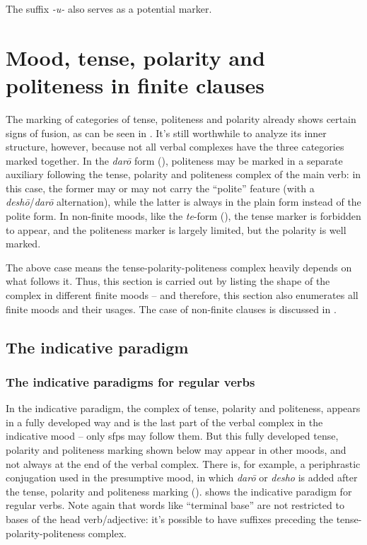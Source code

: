 \documentclass[UTF8, a4paper, oneside, scheme=plain]{ctexrep}
\newcommand{\corpus}[1]{\emph{#1}}
\begin{document}
The suffix \corpus{-u-} also serves as a potential marker.

\section{Mood, tense, polarity and politeness in finite clauses}\label{sec:tense-polarity-polite}

The marking of categories of tense, politeness and polarity 
already shows certain signs of fusion,
as can be seen in .
It's still worthwhile to analyze its inner structure, however,
because not all verbal complexes have the three categories marked together.
In the \corpus{dar\={o}} form (),
politeness may be marked in a separate auxiliary following 
the tense, polarity and politeness complex of the main verb:
in this case, the former may or may not carry the ``polite'' feature
(with a \corpus{desh\={o}}/\corpus{dar\={o}} alternation),
while the latter is always in the plain form instead of the polite form.
In non-finite moods, like the \corpus{te}-form (), 
the tense marker is forbidden to appear,
and the politeness marker is largely limited,
but the polarity is well marked.

The above case means the tense-polarity-politeness complex heavily depends on what follows it.
Thus, this section is carried out by listing the shape of the complex in different finite moods
-- and therefore, this section also enumerates all finite moods and their usages.
The case of non-finite clauses is discussed in .

\subsection{The indicative paradigm}\label{sec:indicative-paradigm}

\subsubsection{The indicative paradigms for regular verbs}

In the indicative paradigm, the complex of tense, polarity and politeness,
appears in a fully developed way
and is the last part of the verbal complex in the indicative mood
-- only \ac{sfp}s may follow them.
But this fully developed tense, polarity and politeness marking shown below
may appear in other moods, and not always at the end of the verbal complex.
There is, for example, a periphrastic conjugation used in the presumptive mood, 
in which \corpus{dar\={o}} or \corpus{desho} is added after the tense, polarity and politeness marking
().
 shows the indicative paradigm for regular verbs. 
Note again that words like ``terminal base'' are not restricted to bases of the head verb/adjective:
it's possible to have suffixes preceding the tense-polarity-politeness complex.
\end{document}
